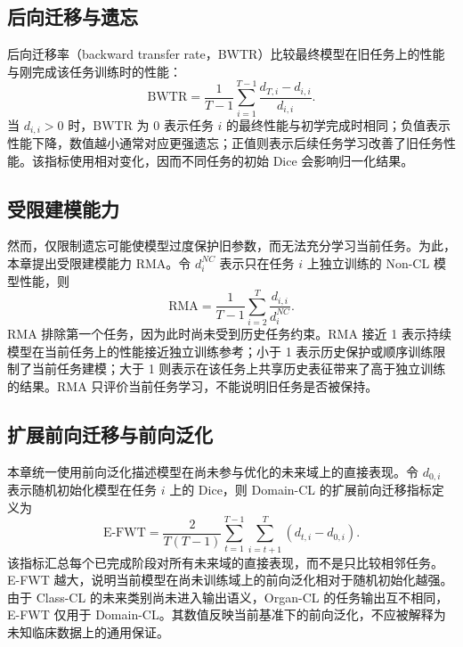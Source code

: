 \subsection*{后向迁移与遗忘}

后向迁移率（backward transfer rate，BWTR）比较最终模型在旧任务上的性能与刚完成该任务训练时的性能：
\begin{equation}
\mathrm{BWTR}
=
\frac{1}{T-1}
\sum_{i=1}^{T-1}
\frac{d_{T,i}-d_{i,i}}{d_{i,i}}.
\label{eq:benchmark-bwtr}
\end{equation}
当 $d_{i,i}>0$ 时，BWTR 为 0 表示任务 $i$ 的最终性能与初学完成时相同；负值表示性能下降，数值越小通常对应更强遗忘；正值则表示后续任务学习改善了旧任务性能。该指标使用相对变化，因而不同任务的初始 Dice 会影响归一化结果。

\subsection*{受限建模能力}

然而，仅限制遗忘可能使模型过度保护旧参数，而无法充分学习当前任务。为此，本章提出受限建模能力 RMA。令 $d_i^{NC}$ 表示只在任务 $i$ 上独立训练的 Non-CL 模型性能，则
\begin{equation}
\mathrm{RMA}
=
\frac{1}{T-1}
\sum_{i=2}^{T}
\frac{d_{i,i}}{d_i^{NC}}.
\label{eq:benchmark-rma}
\end{equation}
RMA 排除第一个任务，因为此时尚未受到历史任务约束。RMA 接近 1 表示持续模型在当前任务上的性能接近独立训练参考；小于 1 表示历史保护或顺序训练限制了当前任务建模；大于 1 则表示在该任务上共享历史表征带来了高于独立训练的结果。RMA 只评价当前任务学习，不能说明旧任务是否被保持。

\subsection*{扩展前向迁移与前向泛化}

本章统一使用前向泛化描述模型在尚未参与优化的未来域上的直接表现。令 $d_{0,i}$ 表示随机初始化模型在任务 $i$ 上的 Dice，则 Domain-CL 的扩展前向迁移指标定义为
\begin{equation}
\mathrm{E\mbox{-}FWT}
=
\frac{2}{T(T-1)}
\sum_{t=1}^{T-1}
\sum_{i=t+1}^{T}
\left(d_{t,i}-d_{0,i}\right).
\label{eq:benchmark-efwt}
\end{equation}
该指标汇总每个已完成阶段对所有未来域的直接表现，而不是只比较相邻任务。E-FWT 越大，说明当前模型在尚未训练域上的前向泛化相对于随机初始化越强。由于 Class-CL 的未来类别尚未进入输出语义，Organ-CL 的任务输出互不相同，E-FWT 仅用于 Domain-CL。其数值反映当前基准下的前向泛化，不应被解释为未知临床数据上的通用保证。

